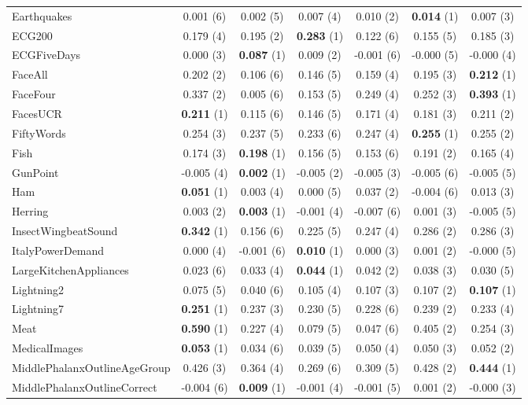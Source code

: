 \begin{table}[ht]
\begin{adjustbox}{width=\textwidth}
\begin{tabular}{lcccccc}
Earthquakes & 0.001 (6) & 0.002 (5) & 0.007 (4) & 0.010 (2) & \textbf{0.014} (1) & 0.007 (3) \\
ECG200 & 0.179 (4) & 0.195 (2) & \textbf{0.283} (1) & 0.122 (6) & 0.155 (5) & 0.185 (3) \\
ECGFiveDays & 0.000 (3) & \textbf{0.087} (1) & 0.009 (2) & -0.001 (6) & -0.000 (5) & -0.000 (4) \\
FaceAll & 0.202 (2) & 0.106 (6) & 0.146 (5) & 0.159 (4) & 0.195 (3) & \textbf{0.212} (1) \\
FaceFour & 0.337 (2) & 0.005 (6) & 0.153 (5) & 0.249 (4) & 0.252 (3) & \textbf{0.393} (1) \\
FacesUCR & \textbf{0.211} (1) & 0.115 (6) & 0.146 (5) & 0.171 (4) & 0.181 (3) & 0.211 (2) \\
FiftyWords & 0.254 (3) & 0.237 (5) & 0.233 (6) & 0.247 (4) & \textbf{0.255} (1) & 0.255 (2) \\
Fish & 0.174 (3) & \textbf{0.198} (1) & 0.156 (5) & 0.153 (6) & 0.191 (2) & 0.165 (4) \\
GunPoint & -0.005 (4) & \textbf{0.002} (1) & -0.005 (2) & -0.005 (3) & -0.005 (6) & -0.005 (5) \\
Ham & \textbf{0.051} (1) & 0.003 (4) & 0.000 (5) & 0.037 (2) & -0.004 (6) & 0.013 (3) \\
Herring & 0.003 (2) & \textbf{0.003} (1) & -0.001 (4) & -0.007 (6) & 0.001 (3) & -0.005 (5) \\
InsectWingbeatSound & \textbf{0.342} (1) & 0.156 (6) & 0.225 (5) & 0.247 (4) & 0.286 (2) & 0.286 (3) \\
ItalyPowerDemand & 0.000 (4) & -0.001 (6) & \textbf{0.010} (1) & 0.000 (3) & 0.001 (2) & -0.000 (5) \\
LargeKitchenAppliances & 0.023 (6) & 0.033 (4) & \textbf{0.044} (1) & 0.042 (2) & 0.038 (3) & 0.030 (5) \\
Lightning2 & 0.075 (5) & 0.040 (6) & 0.105 (4) & 0.107 (3) & 0.107 (2) & \textbf{0.107} (1) \\
Lightning7 & \textbf{0.251} (1) & 0.237 (3) & 0.230 (5) & 0.228 (6) & 0.239 (2) & 0.233 (4) \\
Meat & \textbf{0.590} (1) & 0.227 (4) & 0.079 (5) & 0.047 (6) & 0.405 (2) & 0.254 (3) \\
MedicalImages & \textbf{0.053} (1) & 0.034 (6) & 0.039 (5) & 0.050 (4) & 0.050 (3) & 0.052 (2) \\
MiddlePhalanxOutlineAgeGroup & 0.426 (3) & 0.364 (4) & 0.269 (6) & 0.309 (5) & 0.428 (2) & \textbf{0.444} (1) \\
MiddlePhalanxOutlineCorrect & -0.004 (6) & \textbf{0.009} (1) & -0.001 (4) & -0.001 (5) & 0.001 (2) & -0.000 (3) \\

\end{tabular}
\end{adjustbox}
\end{table}
